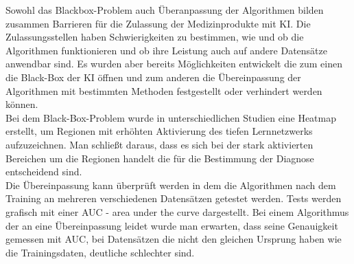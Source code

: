 Sowohl das Blackbox-Problem auch Überanpassung der Algorithmen bilden zusammen Barrieren für die Zulassung der Medizinprodukte mit KI. Die Zulassungsstellen haben Schwierigkeiten zu bestimmen, wie und ob die Algorithmen funktionieren und ob ihre Leistung auch auf andere Datensätze anwendbar sind.\cite{AI_where_are_we_now} Es wurden aber bereits Möglichkeiten entwickelt die zum einen die Black-Box der KI öffnen und zum anderen die Übereinpassung der Algorithmen mit bestimmten Methoden festgestellt oder verhindert werden können.\cite{AI_where_are_we_now} \\

Bei dem Black-Box-Problem wurde in unterschiedlichen Studien eine Heatmap erstellt, um Regionen mit erhöhten Aktivierung des tiefen Lernnetzwerks aufzuzeichnen. Man schließt daraus, dass es sich bei der stark aktivierten Bereichen um die Regionen handelt die für die Bestimmung der Diagnose entscheidend sind.\cite{AI_where_are_we_now}\\
Die Übereinpassung kann überprüft werden in dem die Algorithmen nach dem Training an mehreren verschiedenen Datensätzen getestet werden.\cite{AI_where_are_we_now} Tests werden grafisch mit einer AUC - area under the curve  dargestellt. Bei einem Algorithmus der an eine Übereinpassung leidet wurde man erwarten, dass seine Genauigkeit gemessen mit AUC, bei Datensätzen die nicht den gleichen Ursprung haben wie die Trainingsdaten, deutliche schlechter sind.\cite{AI_where_are_we_now}\\